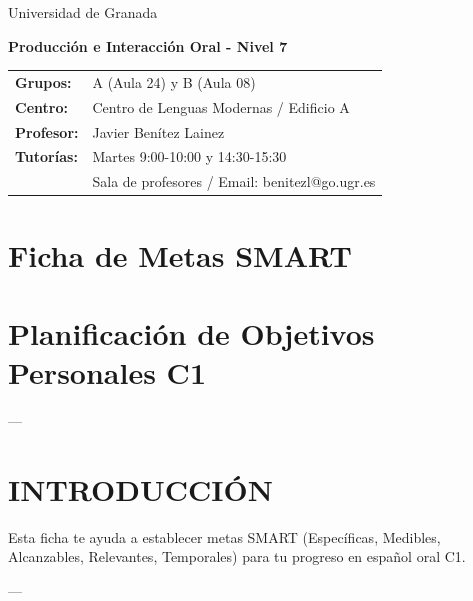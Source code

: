 \documentclass[a4paper,11pt]{article}
\begin{document}
\begin{center}
\small{Universidad de Granada}

\vspace{0.3cm}

\textbf{\large{Producción e Interacción Oral - Nivel 7}}

\vspace{0.4cm}

\small
\begin{tabular}{@{}ll@{}}
\textbf{Grupos:} & A (Aula 24) y B (Aula 08) \\
\textbf{Centro:} & Centro de Lenguas Modernas / Edificio A \\
\textbf{Profesor:} & Javier Benítez Lainez \\
\textbf{Tutorías:} & Martes 9:00-10:00 y 14:30-15:30 \\
& Sala de profesores / Email: benitezl@go.ugr.es
\end{tabular}
\end{center}

\vspace{0.5cm}
\section*{Ficha de Metas SMART}

\vspace{0.4cm}

\section{Planificación de Objetivos Personales C1}

\vspace{0.2cm}

---

\vspace{0.2cm}

\section{INTRODUCCIÓN}

\vspace{0.2cm}

Esta ficha te ayuda a establecer metas SMART (Específicas, Medibles, Alcanzables, Relevantes, Temporales) para tu progreso en español oral C1.

\vspace{0.2cm}

---
\end{document}
